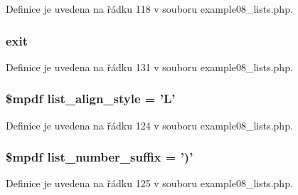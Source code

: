 Definice je uvedena na řádku 118 v souboru example08\-\_\-lists.\-php.

\hypertarget{example08__lists_8php_a6733eb5f605d09eaede9845835d71c4e}{
\subsubsection[{exit}]{\setlength{\rightskip}{0pt plus 5cm}exit}}\label{example08__lists_8php_a6733eb5f605d09eaede9845835d71c4e}


Definice je uvedena na řádku 131 v souboru example08\-\_\-lists.\-php.

\hypertarget{example08__lists_8php_ae723aa964527bc114be3010e4a15c7fb}{
\subsubsection[{list\-\_\-align\-\_\-style}]{\setlength{\rightskip}{0pt plus 5cm}\$mpdf list\-\_\-align\-\_\-style = 'L'}}\label{example08__lists_8php_ae723aa964527bc114be3010e4a15c7fb}


Definice je uvedena na řádku 124 v souboru example08\-\_\-lists.\-php.

\hypertarget{example08__lists_8php_a0e143fd6cd1ed977446f3abf05380031}{
\subsubsection[{list\-\_\-number\-\_\-suffix}]{\setlength{\rightskip}{0pt plus 5cm}\$mpdf list\-\_\-number\-\_\-suffix = ')'}}\label{example08__lists_8php_a0e143fd6cd1ed977446f3abf05380031}


Definice je uvedena na řádku 125 v souboru example08\-\_\-lists.\-php.

